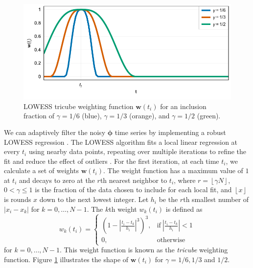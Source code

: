 \begin{figure}
	\centering
	\includegraphics[width=.8\textwidth]{figures/chapter5-lowess/figure1-window.pdf}
	\caption[LOWESS tricube weighting function]{
		LOWESS tricube weighting function $ \bm{w}(t_i) $ for an inclusion fraction of $ \gamma = 1/6 $ (blue), $ \gamma = 1/3 $ (orange), and $ \gamma = 1/2 $ (green).
	}
	\label{fig:ch5-algo-window}
\end{figure}


We can adaptively filter the noisy $ \bm{\phi} $ time series by implementing a robust LOWESS regression \citep{Cleveland1979RobustLocallyWeighted}. The LOWESS algorithm fits a local linear regression at every $t_i$ using nearby data points, repeating over multiple iterations to refine the fit and reduce the effect of outliers \citep{Efron2019ComputerAgeStatistical}.
For the first iteration, at each time $t_i$,  we calculate a set of weights $\bm{w}(t_i)$. The weight function has a maximum value of $1$ at $t_i$ and decays to zero at the $r$th nearest neighbor to $t_i$, where $r = \left\lfloor \gamma N \right\rfloor$, $0 < \gamma \leq 1$ is the fraction of the data chosen to include for each local fit, and $ \left\lfloor x \right\rfloor $ is rounds $ x $ down to the next lowest integer.
Let $h_i$ be the $r$th smallest number of $\left| x_i - x_k \right|$ for $ k = 0, \ldots, N-1 $.
The $k$th weight $w_k(t_i)$ is defined as
\begin{equation}
	w_k(t_i) = 
	\begin{cases}
		\left( 1 - \left|\frac{t_i - t_k}{h_i} \right|^3 \right)^3 , & \text{if}\  \left|\frac{t_i - t_k}{h_i} \right| < 1 \\
		0, & \text{otherwise}
	\end{cases}          \label{eq:ch5-lowess-weights}
\end{equation}
for $k =0, \ldots, N-1 $. This weight function is known as the \emph{tricube} weighting function.
Figure \ref{fig:ch5-algo-window} illustrates the shape of  $ \bm{w}(t_i) $ for $\gamma = 1/6, 1/3$ and  $1/2 $.



